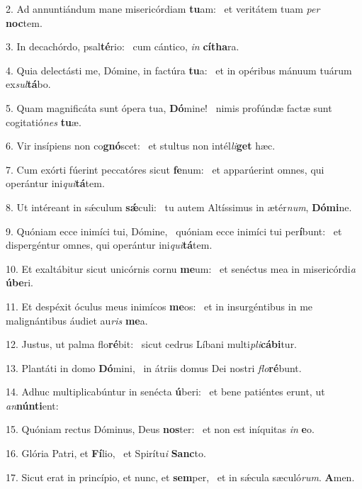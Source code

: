 2. Ad annuntiándum mane misericórdiam \textbf{tu}am: \ast\  et veritátem tuam \textit{per} \textbf{noc}tem.\

3. In decachórdo, psal\textbf{té}rio: \ast\  cum cántico, \textit{in} \textbf{cí}\textbf{tha}ra.\

4. Quia delectásti me, Dómine, in factúra \textbf{tu}a: \ast\  et in opéribus mánuum tuárum ex\textit{sul}\textbf{tá}bo.\

5. Quam magnificáta sunt ópera tua, \textbf{Dó}mine! \ast\  nimis profúndæ factæ sunt cogitatió\textit{nes} \textbf{tu}æ.\

6. Vir insípiens non co\textbf{gnó}scet: \ast\  et stultus non intél\textit{li}\textbf{get} hæc.\

7. Cum exórti fúerint peccatóres sicut \textbf{fe}num: \ast\  et apparúerint omnes, qui operántur ini\textit{qui}\textbf{tá}tem.\

8. Ut intéreant in sǽculum \textbf{sǽ}culi: \ast\  tu autem Altíssimus in ætér\textit{num}, \textbf{Dó}\textbf{mi}ne.\

9. Quóniam ecce inimíci tui, Dómine, \dag\  quóniam ecce inimíci tui per\textbf{í}bunt: \ast\  et dispergéntur omnes, qui operántur ini\textit{qui}\textbf{tá}tem.\

10. Et exaltábitur sicut unicórnis cornu \textbf{me}um: \ast\  et senéctus mea in misericórdi\textit{a} \textbf{ú}\textbf{be}ri.\

11. Et despéxit óculus meus inimícos \textbf{me}os: \ast\  et in insurgéntibus in me malignántibus áudiet au\textit{ris} \textbf{me}a.\

12. Justus, ut palma flo\textbf{ré}bit: \ast\  sicut cedrus Líbani multi\textit{pli}\textbf{cá}\textbf{bi}tur.\

13. Plantáti in domo \textbf{Dó}mini, \ast\  in átriis domus Dei nostri \textit{flo}\textbf{ré}bunt.\

14. Adhuc multiplicabúntur in senécta \textbf{ú}beri: \ast\  et bene patiéntes erunt, ut \textit{an}\textbf{nún}\textbf{ti}ent:\

15. Quóniam rectus Dóminus, Deus \textbf{nos}ter: \ast\  et non est iníquitas \textit{in} \textbf{e}o.\

16. Glória Patri, et \textbf{Fí}lio, \ast\  et Spirítu\textit{i} \textbf{Sanc}to.\

17. Sicut erat in princípio, et nunc, et \textbf{sem}per, \ast\  et in sǽcula sæculó\textit{rum}. \textbf{A}men.\


